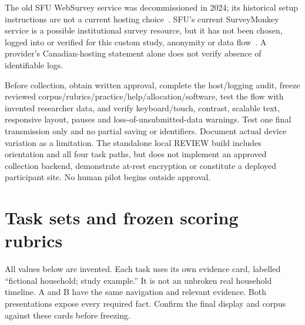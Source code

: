 \documentclass[11pt,letterpaper]{article}
\begin{document}
The old SFU WebSurvey service was decommissioned in 2024; its historical setup instructions are not a current hosting choice~\cite{sfu-websurvey}. SFU's current SurveyMonkey service is a possible institutional survey resource, but it has not been chosen, logged into or verified for this custom study, anonymity or data flow~\cite{sfu-surveymonkey}. A provider's Canadian-hosting statement alone does not verify absence of identifiable logs.

Before collection, obtain written approval, complete the host/logging audit, freeze reviewed corpus/rubrics/practice/help/allocation/software, test the flow with invented researcher data, and verify keyboard/touch, contrast, scalable text, responsive layout, pauses and loss-of-unsubmitted-data warnings. Test one final transmission only and no partial saving or identifiers. Document actual device variation as a limitation. The standalone local REVIEW build includes orientation and all four task paths, but does not implement an approved collection backend, demonstrate at-rest encryption or constitute a deployed participant site. No human pilot begins outside approval.

\appendix
\newpage
\section{Task sets and frozen scoring rubrics}\label{app:tasks}
All values below are invented. Each task uses its own evidence card, labelled ``fictional household; study example.'' It is not an unbroken real household timeline. A and B have the same navigation and relevant evidence. Both presentations expose every required fact. Confirm the final display and corpus against these cards before freezing.
\end{document}
